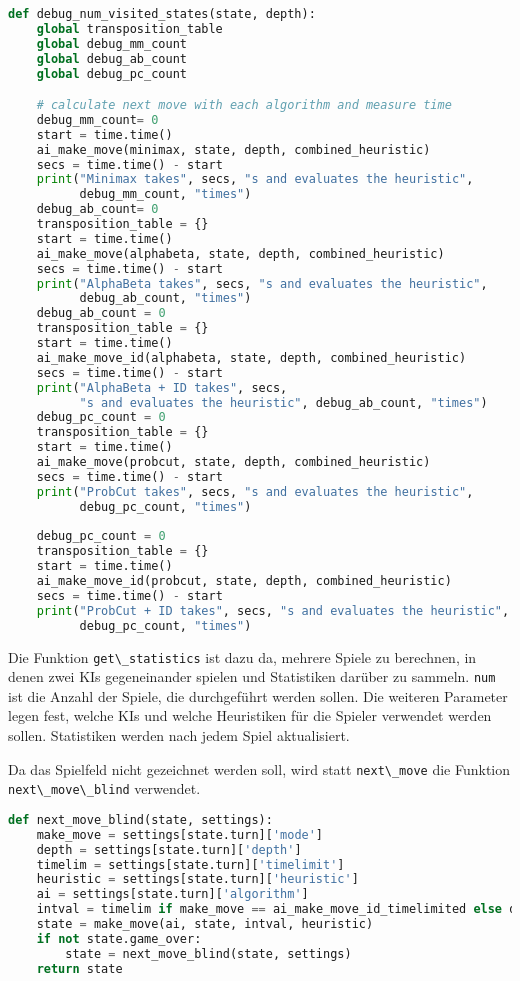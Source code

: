 \begin{lstlisting}[language=Python]
def debug_num_visited_states(state, depth):
    global transposition_table
    global debug_mm_count
    global debug_ab_count
    global debug_pc_count

    # calculate next move with each algorithm and measure time
    debug_mm_count= 0
    start = time.time()
    ai_make_move(minimax, state, depth, combined_heuristic)
    secs = time.time() - start
    print("Minimax takes", secs, "s and evaluates the heuristic",
          debug_mm_count, "times")
    debug_ab_count= 0
    transposition_table = {}
    start = time.time()
    ai_make_move(alphabeta, state, depth, combined_heuristic)
    secs = time.time() - start
    print("AlphaBeta takes", secs, "s and evaluates the heuristic",
          debug_ab_count, "times")
    debug_ab_count = 0
    transposition_table = {}
    start = time.time()
    ai_make_move_id(alphabeta, state, depth, combined_heuristic)
    secs = time.time() - start
    print("AlphaBeta + ID takes", secs,
          "s and evaluates the heuristic", debug_ab_count, "times")
    debug_pc_count = 0
    transposition_table = {}
    start = time.time()
    ai_make_move(probcut, state, depth, combined_heuristic)
    secs = time.time() - start
    print("ProbCut takes", secs, "s and evaluates the heuristic",
          debug_pc_count, "times")
    
    debug_pc_count = 0
    transposition_table = {}
    start = time.time()
    ai_make_move_id(probcut, state, depth, combined_heuristic)
    secs = time.time() - start
    print("ProbCut + ID takes", secs, "s and evaluates the heuristic",
          debug_pc_count, "times")
\end{lstlisting}

Die Funktion \passthrough{\lstinline!get\_statistics!} ist dazu da,
mehrere Spiele zu berechnen, in denen zwei KIs gegeneinander spielen und
Statistiken darüber zu sammeln. \passthrough{\lstinline!num!} ist die
Anzahl der Spiele, die durchgeführt werden sollen. Die weiteren
Parameter legen fest, welche KIs und welche Heuristiken für die Spieler
verwendet werden sollen. Statistiken werden nach jedem Spiel
aktualisiert.

Da das Spielfeld nicht gezeichnet werden soll, wird statt
\passthrough{\lstinline!next\_move!} die Funktion
\passthrough{\lstinline!next\_move\_blind!} verwendet.

\begin{lstlisting}[language=Python]
def next_move_blind(state, settings):
    make_move = settings[state.turn]['mode']
    depth = settings[state.turn]['depth']
    timelim = settings[state.turn]['timelimit']
    heuristic = settings[state.turn]['heuristic']
    ai = settings[state.turn]['algorithm']
    intval = timelim if make_move == ai_make_move_id_timelimited else depth
    state = make_move(ai, state, intval, heuristic)
    if not state.game_over:
        state = next_move_blind(state, settings)
    return state
\end{lstlisting}

